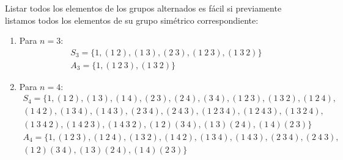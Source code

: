 \begin{ejemplo}
    Listar todos los elementos de los grupos alternados es fácil si previamente listamos todos los elementos de su grupo simétrico correspondiente:
    \begin{enumerate}
        \item Para $n=3$:
        \begin{gather*}
            S_3 = \{1, (1\ 2), (1\ 3), (2\ 3), (1\ 2\ 3), (1\ 3\ 2)\} \\
            A_3 = \{1, (1\ 2\ 3), (1\ 3\ 2)\}
        \end{gather*}
        \item Para $n=4$:
            \begin{multline*}
                S_4 = \{1, (1\ 2), (1\ 3), (1\ 4), (2\ 3), (2\ 4), (3\ 4), (1\ 2\ 3), (1\ 3\ 2), (1\ 2\ 4), \\
                    (1\ 4\ 2), (1\ 3\ 4), (1\ 4\ 3), (2\ 3\ 4), (2\ 4\ 3), (1\ 2\ 3\ 4), (1\ 2\ 4\ 3), (1\ 3\ 2\ 4),\\
                     (1\ 3\ 4\ 2), (1\ 4\ 2\ 3), (1\ 4\ 3\ 2), (1\ 2)(3\ 4), (1\ 3)(2\ 4), (1\ 4)(2\ 3)\}
            \end{multline*}
            \begin{multline*}
                A_4 = \{1, (1\ 2\ 3), (1\ 2\ 4), (1\ 3\ 2), (1\ 4\ 2), (1\ 3\ 4), (1\ 4\ 3), (2\ 3\ 4), (2\ 4\ 3), \\
                (1\ 2)(3\ 4), (1\ 3)(2\ 4), (1\ 4)(2\ 3)\}
            \end{multline*}
    \end{enumerate}
\end{ejemplo}

